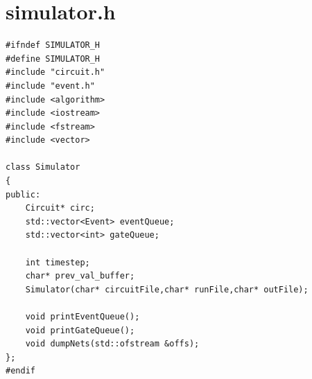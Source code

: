 \documentclass[a4paper,onesided,12pt]{report}
\begin{document}
\section{simulator.h}
\begin{verbatim}
#ifndef SIMULATOR_H
#define SIMULATOR_H
#include "circuit.h"
#include "event.h"
#include <algorithm>
#include <iostream>
#include <fstream>
#include <vector>

class Simulator
{
public:
	Circuit* circ;
	std::vector<Event> eventQueue;
	std::vector<int> gateQueue;

	int timestep;
	char* prev_val_buffer;
	Simulator(char* circuitFile,char* runFile,char* outFile);

	void printEventQueue();
	void printGateQueue();
	void dumpNets(std::ofstream &offs);
};
#endif																								

\end{verbatim}
\end{document}
